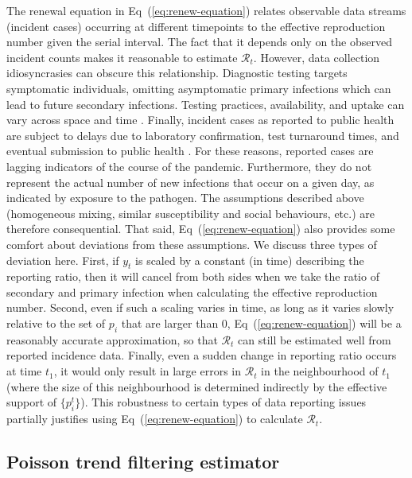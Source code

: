\documentclass[10pt,letterpaper]{article}
\def\calR{\mathcal{R}}
\newcommand{\citep}[1]{\cite{#1}}
\renewcommand{\eqref}[1]{Eq~(\ref{#1})}
\begin{document}
The renewal equation in \eqref{eq:renew-equation} relates observable data
streams (incident cases) occurring at different timepoints to the effective reproduction
number given the serial interval. The fact that it depends only on the observed
incident counts makes it reasonable to estimate $\calR_t$. However, 
data collection idiosyncrasies can obscure this relationship. Diagnostic testing
targets symptomatic individuals, omitting asymptomatic primary infections which
can lead to future secondary infections. Testing practices, availability, and
uptake can vary across space and time \citep{pitzer2021impact,
hitchings2021usefulness}. Finally, incident cases as reported to public health
are subject to delays due to laboratory confirmation, test turnaround times, and
eventual submission to public health \citep{pellis2021challenges}. For these
reasons, reported cases are lagging indicators of the course of the pandemic.
Furthermore, they do not represent the actual number of new infections that
occur on a given day, as indicated by exposure to the pathogen. The assumptions
described above (homogeneous mixing,
similar susceptibility and social behaviours, etc.) are therefore consequential.
That said, \eqref{eq:renew-equation} also provides some comfort about deviations
from these assumptions. We discuss three types of deviation here.
First, if $y_t$ is scaled by a constant (in time) describing
the reporting ratio, then it will cancel from both sides when we take the ratio
of secondary and primary infection when calculating the effective reproduction 
number. Second, even if such a scaling varies in time, as long as it varies slowly relative
to the set of $p_i$ that are larger than 0, \eqref{eq:renew-equation} will be a
reasonably accurate approximation, so that $\calR_t$ can still be estimated well
from reported incidence data. Finally, even a sudden change in reporting ratio
occurs at time $t_1$, it would only result in 
large errors in $\calR_t$ in the neighbourhood of $t_1$ (where the size of this 
neighbourhood is determined indirectly by the effective support of $\{p^t_i\}$). 
This robustness to certain types of data reporting issues partially justifies 
using \eqref{eq:renew-equation} to calculate $\calR_t$.


\subsection{Poisson trend filtering estimator} 
\end{document}
